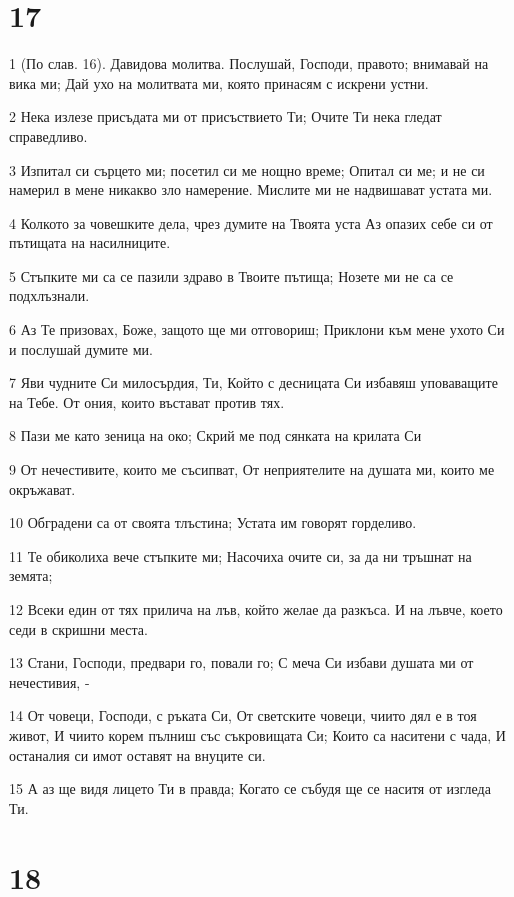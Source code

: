 \chapter{17}

\par 1 (По слав. 16). Давидова молитва. Послушай, Господи, правото; внимавай на вика ми; Дай ухо на молитвата ми, която принасям с искрени устни.
\par 2 Нека излезе присъдата ми от присъствието Ти; Очите Ти нека гледат справедливо.
\par 3 Изпитал си сърцето ми; посетил си ме нощно време; Опитал си ме; и не си намерил в мене никакво зло намерение. Мислите ми не надвишават устата ми.
\par 4 Колкото за човешките дела, чрез думите на Твоята уста Аз опазих себе си от пътищата на насилниците.
\par 5 Стъпките ми са се пазили здраво в Твоите пътища; Нозете ми не са се подхлъзнали.
\par 6 Аз Те призовах, Боже, защото ще ми отговориш; Приклони към мене ухото Си и послушай думите ми.
\par 7 Яви чудните Си милосърдия, Ти, Който с десницата Си избавяш уповаващите на Тебе. От ония, които въстават против тях.
\par 8 Пази ме като зеница на око; Скрий ме под сянката на крилата Си
\par 9 От нечестивите, които ме съсипват, От неприятелите на душата ми, които ме окръжават.
\par 10 Обградени са от своята тлъстина; Устата им говорят горделиво.
\par 11 Те обиколиха вече стъпките ми; Насочиха очите си, за да ни тръшнат на земята;
\par 12 Всеки един от тях прилича на лъв, който желае да разкъса. И на лъвче, което седи в скришни места.
\par 13 Стани, Господи, предвари го, повали го; С меча Си избави душата ми от нечестивия, -
\par 14 От човеци, Господи, с ръката Си, От светските човеци, чиито дял е в тоя живот, И чиито корем пълниш със съкровищата Си; Които са наситени с чада, И останалия си имот оставят на внуците си.
\par 15 А аз ще видя лицето Ти в правда; Когато се събудя ще се наситя от изгледа Ти.

\chapter{18}

